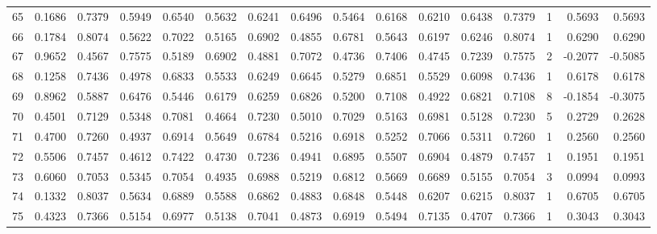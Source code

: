 \begin{tabular}{lrrrrrrrrrrrrrrr}
65  &      0.1686 &  0.7379 &  0.5949 &  0.6540 &  0.5632 &  0.6241 &  0.6496 &  0.5464 &  0.6168 &  0.6210 &   0.6438 &     0.7379 &      1 &                    0.5693 &                     0.5693 \\
66  &      0.1784 &  0.8074 &  0.5622 &  0.7022 &  0.5165 &  0.6902 &  0.4855 &  0.6781 &  0.5643 &  0.6197 &   0.6246 &     0.8074 &      1 &                    0.6290 &                     0.6290 \\
67  &      0.9652 &  0.4567 &  0.7575 &  0.5189 &  0.6902 &  0.4881 &  0.7072 &  0.4736 &  0.7406 &  0.4745 &   0.7239 &     0.7575 &      2 &                   -0.2077 &                    -0.5085 \\
68  &      0.1258 &  0.7436 &  0.4978 &  0.6833 &  0.5533 &  0.6249 &  0.6645 &  0.5279 &  0.6851 &  0.5529 &   0.6098 &     0.7436 &      1 &                    0.6178 &                     0.6178 \\
69  &      0.8962 &  0.5887 &  0.6476 &  0.5446 &  0.6179 &  0.6259 &  0.6826 &  0.5200 &  0.7108 &  0.4922 &   0.6821 &     0.7108 &      8 &                   -0.1854 &                    -0.3075 \\
70  &      0.4501 &  0.7129 &  0.5348 &  0.7081 &  0.4664 &  0.7230 &  0.5010 &  0.7029 &  0.5163 &  0.6981 &   0.5128 &     0.7230 &      5 &                    0.2729 &                     0.2628 \\
71  &      0.4700 &  0.7260 &  0.4937 &  0.6914 &  0.5649 &  0.6784 &  0.5216 &  0.6918 &  0.5252 &  0.7066 &   0.5311 &     0.7260 &      1 &                    0.2560 &                     0.2560 \\
72  &      0.5506 &  0.7457 &  0.4612 &  0.7422 &  0.4730 &  0.7236 &  0.4941 &  0.6895 &  0.5507 &  0.6904 &   0.4879 &     0.7457 &      1 &                    0.1951 &                     0.1951 \\
73  &      0.6060 &  0.7053 &  0.5345 &  0.7054 &  0.4935 &  0.6988 &  0.5219 &  0.6812 &  0.5669 &  0.6689 &   0.5155 &     0.7054 &      3 &                    0.0994 &                     0.0993 \\
74  &      0.1332 &  0.8037 &  0.5634 &  0.6889 &  0.5588 &  0.6862 &  0.4883 &  0.6848 &  0.5448 &  0.6207 &   0.6215 &     0.8037 &      1 &                    0.6705 &                     0.6705 \\
75  &      0.4323 &  0.7366 &  0.5154 &  0.6977 &  0.5138 &  0.7041 &  0.4873 &  0.6919 &  0.5494 &  0.7135 &   0.4707 &     0.7366 &      1 &                    0.3043 &                     0.3043 \\

\end{tabular}
